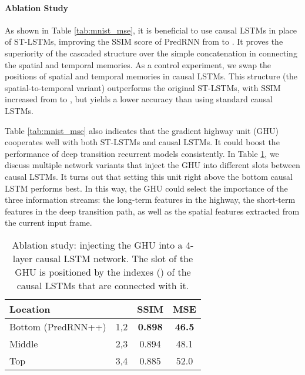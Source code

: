 \documentclass{article}
\begin{document}
\paragraph{Ablation Study} 
As shown in Table \ref{tab:mnist_mse}, it is beneficial to use causal LSTMs in place of ST-LSTMs, improving the SSIM score of PredRNN from  to . It proves the superiority of the cascaded structure over the simple concatenation in connecting the spatial and temporal memories. As a control experiment, we swap the positions of spatial and temporal memories in causal LSTMs. This structure (the spatial-to-temporal variant) outperforms the original ST-LSTMs, with SSIM increased from  to , but yields a lower accuracy than using standard causal LSTMs. 



Table \ref{tab:mnist_mse} also indicates that the gradient highway unit (GHU) cooperates well with both ST-LSTMs and causal LSTMs. It could boost the performance of deep transition recurrent models consistently.
In Table \ref{tab:ablation}, we discuss multiple network variants that inject the GHU into different slots between causal LSTMs. It turns out that setting this unit right above the bottom causal LSTM performs best. In this way, the GHU could select the importance of the three information streams: the long-term features in the highway, the short-term features in the deep transition path, as well as the spatial features extracted from the current input frame.



\begin{table}[htb]
\caption{Ablation study: injecting the GHU into a 4-layer causal LSTM network. The slot of the GHU is positioned by the indexes () of the causal LSTMs that are connected with it.}
\label{tab:ablation}
\vskip 0.15in
\centering
\begin{small}
\begin{sc}
\begin{tabular}{lccc}
\toprule
Location &  & SSIM & MSE \\
\midrule
Bottom (PredRNN++) 	& 1,2 &	\textbf{0.898} & \textbf{46.5} \\
Middle	  			& 2,3 & 0.894 & 48.1 \\
Top 				& 3,4 & 0.885 & 52.0 \\
\bottomrule
\end{tabular}
\end{sc}
\end{small}
\end{table}
\end{document}
